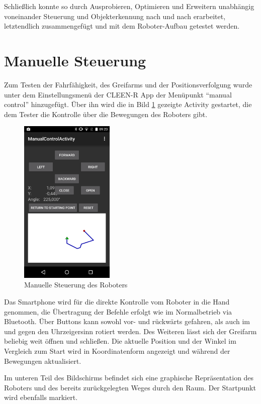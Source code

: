 Schließlich konnte so durch Ausprobieren, Optimieren und Erweitern unabhängig voneinander Steuerung und Objekterkennung nach und nach erarbeitet, letztendlich zusammengefügt und mit dem Roboter-Aufbau getestet werden.

\section{Manuelle Steuerung}

Zum Testen der Fahrfähigkeit, des Greifarms und der Positionsverfolgung wurde unter dem Einstellungsmenü der CLEEN-R App der Menüpunkt \enquote{manual control} hinzugefügt. Über ihn wird die in Bild \ref{fig:manualControl} gezeigte Activity gestartet, die dem Tester die Kontrolle über die Bewegungen des Roboters gibt.

\begin{figure}[h]
\centering
\includegraphics[width=0.4\textwidth]{Bilder/Tests/manualControl}
\caption{Manuelle Steuerung des Roboters}
\label{fig:manualControl}
\end{figure}

Das Smartphone wird für die direkte Kontrolle vom Roboter in die Hand genommen, die Übertragung der Befehle erfolgt wie im Normalbetrieb via Bluetooth. Über Buttons kann sowohl vor- und rückwärts gefahren, als auch im und gegen den Uhrzeigersinn rotiert werden. Des Weiteren lässt sich der Greifarm beliebig weit öffnen und schließen. Die aktuelle Position und der Winkel im Vergleich zum Start wird in Koordinatenform angezeigt und während der Bewegungen aktualisiert. 

Im unteren Teil des Bildschirms befindet sich eine graphische Repräsentation des Roboters und des bereits zurückgelegten Weges durch den Raum. Der Startpunkt wird ebenfalls markiert.

